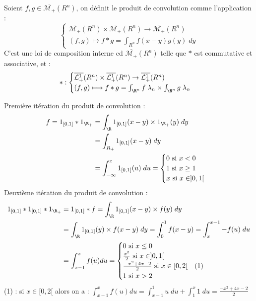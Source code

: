 \begin{definition}
    Soient $f,g \in \overline{\mathcal{M}_+}(R^n)$, on définit le produit de convolution comme l'application :
        \[ \boxed{
            \begin{cases}
                \overline{\mathcal{M}_+}(R^n) \times \overline{\mathcal{M}_+}(R^n) \rightarrow \overline{\mathcal{M}_+}(R^n) \\ 
                (f,g) \longmapsto f \ast g = \int_{R^n} f(x-y)g(y) \; dy
            \end{cases}}
        \]
    C'est une loi de composition interne cd $\overline{\mathcal{M}_+}(R^n)$ telle que $\ast$ est commutative et associative, et :
        \[ \ast : 
            \begin{cases}
                \overline{\mathcal{L}_+^1}(R^n) \times \overline{\mathcal{L}_+^1}(R^n) \rightarrow \overline{\mathcal{L}_+^1}(R^n) \\ 
                (f,g) \longmapsto f \ast g = \int_{\R^n} f\; \lambda_n \times \int_{\R^n} g\; \lambda_n 
            \end{cases}
        \] 
\end{definition}

\begin{example}
    Première itération du produit de convolution :
    \begin{align*}
        f = 1_{[0,1]} \ast 1_{\R_+} &= \int_\R 1_{[0,1]}(x-y) \times 1_{\R_+}(y) \; dy \\
        &= \int_{R_+} 1_{[0,1]}(x-y) \; dy  \\ 
          &= \int_{- \infty}^{x} 1_{[0,1]}(u) \; du = 
          \begin{cases}
            0 \text{ si } x < 0 \\ 
            1 \text{ si } x \geq 1 \\ 
            x \text{ si } x \in ]0,1[ 
          \end{cases}
    \end{align*}
    Deuxième itération du produit de convolution :
    \begin{align*}
        1_{[0,1]} \ast 1_{[0,1]} \ast 1_{\R_+} &= 1_{[0,1]} \ast f = \int_\R 1_{[0,1]}(x-y) \times f(y) \; dy \\ 
        &= \int_\R 1_{[0,1]}(y) \times f(x-y) \; dy = \int_{0}^{1} f(x-y) = \int_{x}^{x-1} -f(u) \; du \\
        &= \int_{x-1}^{x} f(u) du =
        \begin{cases}
            0 \text{ si } x \leq 0 \\
            \frac{x^2}{2} \text{ si } x \in ]0,1[ \\ 
            \frac{-x^2 + 4x -2}{2} \text{ si } x \in [0,2[ \quad (1)\\ 
            1 \text{ si } x > 2
        \end{cases} 
    \end{align*}
    (1) : si  $x \in [0,2[$ alors on a : $\int_{x-1}^{x} f(u) du = \int_{x-1}^{1} u \; du + \int_{1}^{x} 1 \; du =  \frac{-x^2 + 4x -2}{2} $
\end{example}


